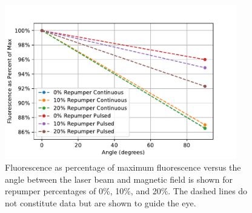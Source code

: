 \begin{figure}[htpb]
	\centering
	\includegraphics[width=0.9\textwidth]{../../MRPData/Repumping/20scaled.pdf}
	\caption{Fluorescence as percentage of maximum fluorescence versus the angle between the laser beam and magnetic field is shown for repumper percentages of 0\%, 10\%, and 20\%. The dashed lines do not constitute data but are shown to guide the eye.}
	\label{fig:0repump}
\end{figure}


